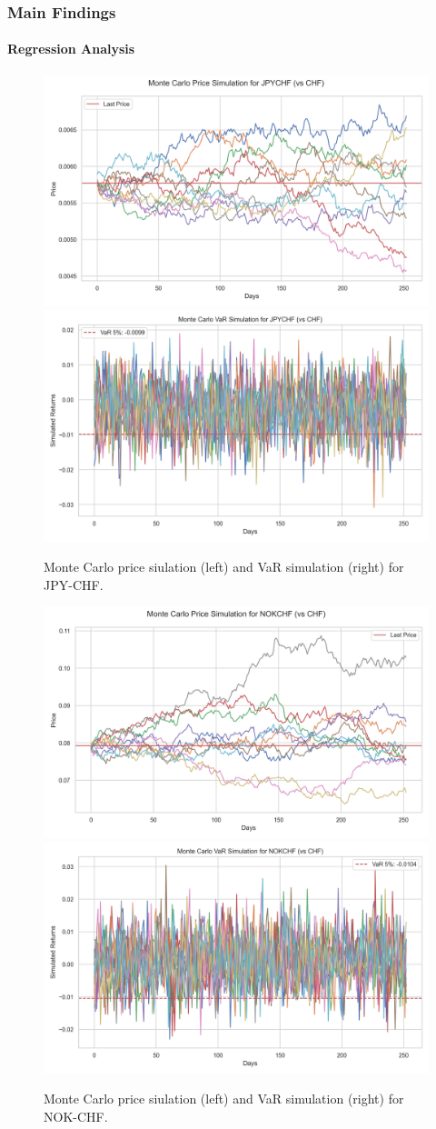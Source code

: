 \documentclass[10pt]{beamer}
\begin{document}
\begin{frame}
\frametitle{Main Findings}
\framesubtitle{Regression Analysis}
\begin{figure}
    \centering  \includegraphics[width=0.48\linewidth]{reports/figures/monte_carlo_price_simulation_JPYCHF_vs_CHF.png}  \label{fig:monte_carlo_price_simulation_JPYCHF_vs_CHF}
    \includegraphics[width=0.48\linewidth]{reports/figures/monte_carlo_var_simulation_JPYCHF_vs_CHF.png}  \label{fig:monte_carlo_var_simulation_JPYCHF_vs_CHF}
    \caption{\footnotesize Monte Carlo price siulation (left) and VaR simulation (right) for JPY-CHF.}
\end{figure}
\begin{figure}
    \centering   \includegraphics[width=0.48\linewidth]{reports/figures/monte_carlo_price_simulation_NOKCHF_vs_CHF.png} \label{fig:monte_carlo_price_simulation_NOKCHF_vs_CHF}
    \includegraphics[width=0.48\linewidth]{reports/figures/monte_carlo_var_simulation_NOKCHF_vs_CHF.png} \label{fig:monte_carlo_var_simulation_NOKCHF_vs_CHF}
    \caption{\footnotesize Monte Carlo price siulation (left) and VaR simulation (right) for NOK-CHF.}
\end{figure}
\end{frame}
\end{document}
